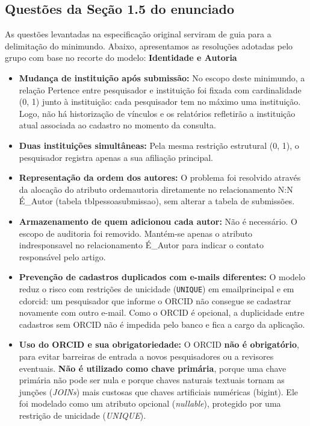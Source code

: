 \documentclass[12pt,a4paper]{article}
\newcommand{\tbus}{\textunderscore\allowbreak}
\newcommand{\tb}[1]{{\ttfamily\let\_\tbus #1}}
\newcommand{\rel}[1]{\textsf{#1}}
\begin{document}
\subsection{Questões da Seção 1.5 do enunciado}
As questões levantadas na especificação original serviram de guia para a delimitação do minimundo. Abaixo, apresentamos as resoluções adotadas pelo grupo com base no recorte do modelo:
\vspace{6pt}
\noindent\textbf{Identidade e Autoria}
\begin{itemize}
    \item \textbf{Mudança de instituição após submissão:} No escopo deste minimundo, a relação \rel{Pertence} entre pesquisador e instituição foi fixada com cardinalidade (0, 1) junto à instituição: cada pesquisador tem no máximo uma instituição. Logo, não há historização de vínculos e os relatórios refletirão a instituição atual associada ao cadastro no momento da consulta.
    \item \textbf{Duas instituições simultâneas:} Pela mesma restrição estrutural (0, 1), o pesquisador registra apenas a sua afiliação principal.
    \item \textbf{Representação da ordem dos autores:} O problema foi resolvido através da alocação do atributo \tb{ordem\_autoria} diretamente no relacionamento N:N \rel{É\_Autor} (tabela \tb{tbl\_pessoa\_submissao}), sem alterar a tabela de submissões.
    \item \textbf{Armazenamento de quem adicionou cada autor:} Não é necessário. O escopo de auditoria foi removido. Mantém-se apenas o atributo \tb{ind\_responsavel} no relacionamento \rel{É\_Autor} para indicar o contato responsável pelo artigo.
    \item \textbf{Prevenção de cadastros duplicados com e-mails diferentes:} O modelo reduz o risco com restrições de unicidade (\texttt{UNIQUE}) em \tb{email\_principal} e em \tb{cd\_orcid}: um pesquisador que informe o ORCID não consegue se cadastrar novamente com outro e-mail. Como o ORCID é opcional, a duplicidade entre cadastros sem ORCID não é impedida pelo banco e fica a cargo da aplicação.
    \item \textbf{Uso do ORCID e sua obrigatoriedade:} O ORCID \textbf{não é obrigatório}, para evitar barreiras de entrada a novos pesquisadores ou a revisores eventuais. \textbf{Não é utilizado como chave primária}, porque uma chave primária não pode ser nula e porque chaves naturais textuais tornam as junções (\textit{JOINs}) mais custosas que chaves artificiais numéricas (\tb{bigint}). Ele foi modelado como um atributo opcional (\textit{nullable}), protegido por uma restrição de unicidade (\textit{UNIQUE}).
\end{itemize}
\end{document}
